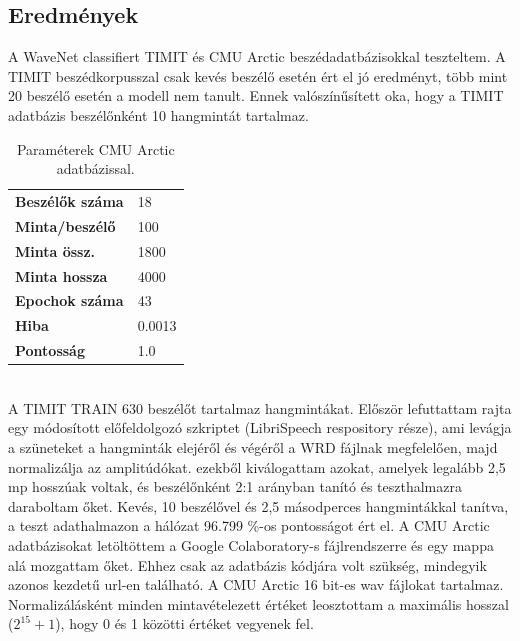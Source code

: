 \subsection{Eredmények}

A WaveNet classifiert TIMIT és CMU Arctic beszédadatbázisokkal teszteltem. A TIMIT beszédkorpusszal csak kevés beszélő esetén ért el jó eredményt, több mint 20 beszélő esetén a modell nem tanult. Ennek valószínűsített oka, hogy a TIMIT adatbázis beszélőnként 10 hangmintát tartalmaz.

\setlength\arrayrulewidth{0.6pt}

\begin{table}[!ht]
	\begin{tabular}{l|l} \toprule
		\bfseries Beszélők száma & 18 \\
		\rowcolor{gray!10}
		\bfseries Minta/beszélő & 100\\
		\bfseries Minta össz. & 1800 \\
		\rowcolor{gray!10}
		\bfseries Minta hossza & 4000 \\
		\bfseries Epochok száma & 43\\
		\rowcolor{gray!10}
		\bfseries Hiba & 0.0013 \\ 
		\bfseries Pontosság & 1.0 \\ 
		\bottomrule
		\hline
	\end{tabular}
	\centering
	\caption{Paraméterek CMU Arctic adatbázissal.}
	\label{fig:wavenet-arctic}
\end{table}
\ \\
A TIMIT TRAIN 630 beszélőt tartalmaz hangmintákat. Először lefuttattam rajta egy módosított előfeldolgozó szkriptet (LibriSpeech respository része), ami levágja a szüneteket a hangminták elejéről és végéről a WRD fájlnak megfelelően, majd normalizálja az amplitúdókat. ezekből kiválogattam azokat, amelyek legalább 2,5 mp hosszúak voltak, és beszélőnként 2:1 arányban tanító és teszthalmazra daraboltam őket.
Kevés, 10 beszélővel és 2,5 másodperces hangmintákkal tanítva, a teszt adathalmazon a hálózat 96.799 \%-os pontosságot ért el.
\newline
\newline
A CMU Arctic adatbázisokat letöltöttem a Google Colaboratory-s fájlrendszerre és egy mappa alá mozgattam őket. Ehhez csak az adatbázis kódjára volt szükség, mindegyik azonos kezdetű url-en található.
A CMU Arctic 16 bit-es wav fájlokat tartalmaz. Normalizálásként minden mintavételezett értéket leosztottam a maximális hosszal ($2^15 + 1$), hogy 0 és 1 közötti értéket vegyenek fel.
